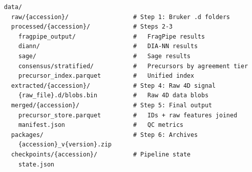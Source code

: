 \documentclass[10pt,twoside]{article}
\begin{document}
\begin{verbatim}
data/
  raw/{accession}/                  # Step 1: Bruker .d folders
  processed/{accession}/            # Steps 2-3
    fragpipe_output/                #   FragPipe results
    diann/                          #   DIA-NN results
    sage/                           #   Sage results
    consensus/stratified/           #   Precursors by agreement tier
    precursor_index.parquet         #   Unified index
  extracted/{accession}/            # Step 4: Raw 4D signal
    {raw_file}.d/blobs.bin          #   Raw 4D data blobs
  merged/{accession}/               # Step 5: Final output
    precursor_store.parquet         #   IDs + raw features joined
    manifest.json                   #   QC metrics
  packages/                         # Step 6: Archives
    {accession}_v{version}.zip
  checkpoints/{accession}/          # Pipeline state
    state.json
\end{verbatim}
\end{document}

